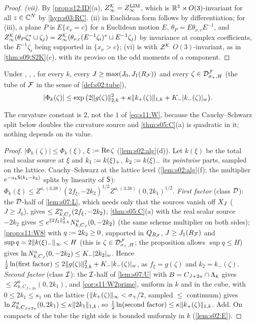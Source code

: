 \begin{proof}
\emph{(vii).} By \cref{prop:s12:ID}(a), $Z^{\mathcal K}_{\infty}=Z^{\mathrm{LIM}}_\infty$, which is $\mathbb R^3\rtimes O(3)$-invariant for all $z\in\mathbb C^N$ by \cref{hyp:s03:RC}. (ii) in Euclidean form follows by differentiation; for (iii), a plane $P$ is $E\{x_\nu=c\}$ for a Euclidean motion $E$, $\theta_P=E\theta_{\nu,c}E^{-1}$, and $Z^{\mathcal K}_{\infty}(\theta_P\zeta^*_i\sqcup\zeta_j)=Z^{\mathcal K}_{\infty}(\theta_{\nu,c}(E^{-1}\zeta_i)^*\sqcup E^{-1}\zeta_j)$ by invariance at complex coefficients, the $E^{-1}\zeta_i$ being supported in $\{x_\nu>c\}$; (vi) is \cite[Cor.~10.44]{SymPhase} with $\mathcal Z^{\mathcal K}$ $O(3)$-invariant, as in \cref{thm:s09:S2K}(c), with its proviso on the odd moments of a component.
\end{proof}

\begin{lemma}\label{lem:s12:claim4prime}
Under \Tthree, \Bcell, \SCH, for every $k$, every $J\ge\max(J_0,J_1(R_{\mathcal F}))$ and every $\zeta\in\mathcal D^{\mathcal F}_{\sigma_+,H}$ (the tube of $\mathcal F$ in the sense of \cref{def:s02:tube}),
\[
|\Phi_k(\zeta)|\le\exp\big(2\lVert g(\zeta)\rVert^2_{2,k}+\kappa\lVert k_+(\zeta)\rVert_{1,k}+K_-\lvert k_-(\zeta)\rvert_{w}\big).
\]
\end{lemma}
The curvature constant is $2$, not the $1$ of \eqref{eq:s11:W}, because the Cauchy--Schwarz split below doubles the curvature source and \cref{thm:s05:C}(a) is quadratic in it; nothing depends on its value.

\begin{proof}
$|\Phi_k(\zeta)|\le\Phi_k(\xi)$, $\xi:=\operatorname{Re}\zeta$ (\cref{lem:s02:alg}(d)). Let $k(\xi)$ be the total real scalar source at $\xi$ and $k_1:= k(\xi)_+$, $k_2:= k(\xi)_-$ its \emph{pointwise} parts, sampled on the lattice. Cauchy--Schwarz at the lattice level (\cref{lem:s02:alg}(f); the multiplier $e^{-a_k\mathsf S(k_1-k_2)}$ splits by linearity of $\mathsf S$): $\Phi_k(\xi)\le Z^{a,(3.38)}(2f_\xi,-2k_2)^{1/2}Z^{a,(3.38)}(0,2k_1)^{1/2}$. \emph{First factor} (class $\mathcal D$): the $\mathcal D$-half of \cref{lem:s07:L}, which needs only that the sources vanish off $X_J$ ($J\ge J_0$), gives $\le Z^a_{k,C_J}(2f_\xi,-2k_2)$; \cref{thm:s05:C}(a) with the real scalar source $-2k_2$ gives $\le e^{\lVert 2f_\xi\rVert^2_{2,k}}N^a_{k,C_J}(0,-2k_2)$ (the same scheme multiplier on both sides); \cref{prop:s11:W8} with $q:=2k_2\ge0$, supported in $Q_{R_{\mathcal F}}$, $J\ge J_1(R_{\mathcal F})$ and $\sup q=2\lVert k(\xi)_-\rVert_\infty<H$ (this is $\zeta\in\mathcal D^{\mathcal F}_{\sigma_+,H}$; the proposition allows $\sup q\le H$) gives $\ln N^a_{k,C_J}(0,-2k_2)\le K_-\lvert 2k_2\rvert_{w}$. Hence $\tfrac12\ln(\text{first factor})\le2\lVert g(\zeta)\rVert^2_{2,k}+K_-\lvert k_-(\zeta)\rvert_{w}$, as $f_\xi=g(\zeta)$ and $k_2=k_-(\zeta)$. \emph{Second factor} (class $\mathcal I$): the $\mathcal I$-half of \cref{lem:s07:U} with $B=C_{J+2n}\cap\Lambda_k$ gives $\le Z^a_{k,C_{J+2n}}(0,2k_1)$, and \cref{cor:s11:W2prime}, uniform in $k$ and in the cube, with $0\le2k_1\le s_1$ on the lattice ($\lVert k_+(\zeta)\rVert_\infty<\sigma_+/2$, sampled $\le$ continuum) gives $\ln Z^a_{k,C_{J+2n}}(0,2k_1)\le\kappa\lVert 2k_1\rVert_{1,k}$, so $\tfrac12\ln(\text{second factor})\le\kappa\lVert k_+(\zeta)\rVert_{1,k}$. Add. On compacts of the tube the right side is bounded uniformly in $k$ (\cref{lem:s02:E}).
\end{proof}


